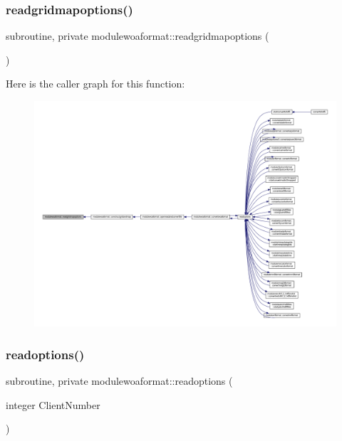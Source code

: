 \mbox{\label{namespacemodulewoaformat_aa0e457259f521e3a55f034b74dd55c94}} 
\subsubsection{\texorpdfstring{readgridmapoptions()}{readgridmapoptions()}}
{\footnotesize\ttfamily subroutine, private modulewoaformat\+::readgridmapoptions (\begin{DoxyParamCaption}{ }\end{DoxyParamCaption})\hspace{0.3cm}{\ttfamily [private]}}

Here is the caller graph for this function\+:\nopagebreak
\begin{figure}[H]
\begin{center}
\leavevmode
\includegraphics[width=350pt]{namespacemodulewoaformat_aa0e457259f521e3a55f034b74dd55c94_icgraph}
\end{center}
\end{figure}
\mbox{\label{namespacemodulewoaformat_a6d0d1a11ce029e5c725fd2564de93691}} 
\subsubsection{\texorpdfstring{readoptions()}{readoptions()}}
{\footnotesize\ttfamily subroutine, private modulewoaformat\+::readoptions (\begin{DoxyParamCaption}\item[{integer}]{Client\+Number }\end{DoxyParamCaption})\hspace{0.3cm}{\ttfamily [private]}}

